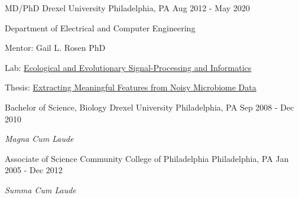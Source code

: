 

\begin{cventries}

  \cventry
    {MD/PhD} %
    {Drexel University} %
    {Philadelphia, PA} %
    {Aug 2012 - May 2020} %
    {
      \begin{cvitems} %
         \item Department of Electrical and Computer Engineering
         \item Mentor: Gail L. Rosen PhD
         \item Lab: \href{http://drexeleesi.com/}{Ecological and Evolutionary Signal-Processing and Informatics}
	 \item Thesis: \href{https://idea.library.drexel.edu/islandora/object/idea\%3A8189}{Extracting Meaningful Features from Noisy Microbiome Data}
      \end{cvitems}
    }
  \cventry
    {Bachelor of Science, Biology} %
    {Drexel University} %
    {Philadelphia, PA} %
    {Sep 2008 - Dec 2010} %
    {
      \begin{cvitems} %
         \item \textit{Magna Cum Laude}
      \end{cvitems}
    }
  \cventry
    {Associate of Science} %
    {Community College of Philadelphia} %
    {Philadelphia, PA} %
    {Jan 2005 - Dec 2012} %
    {
      \begin{cvitems} %
         \item \textit{Summa Cum Laude}
      \end{cvitems}
    }

\end{cventries}
